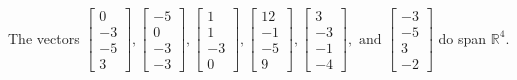\begin{exercise}
\begin{exerciseStatement}
  \end{exerciseStatement}
  \begin{exerciseAnswer}
   The vectors \(\left[\begin{array}{r}
0 \\
-3 \\
-5 \\
3
\end{array}\right] , \left[\begin{array}{r}
-5 \\
0 \\
-3 \\
-3
\end{array}\right] , \left[\begin{array}{r}
1 \\
1 \\
-3 \\
0
\end{array}\right] , \left[\begin{array}{r}
12 \\
-1 \\
-5 \\
9
\end{array}\right] , \left[\begin{array}{r}
3 \\
-3 \\
-1 \\
-4
\end{array}\right] , \text{ and } \left[\begin{array}{r}
-3 \\
-5 \\
3 \\
-2
\end{array}\right]\) 
  	 do  
	span \(\mathbb{R}^4\).
  


  \end{exerciseAnswer}
\end{exercise}